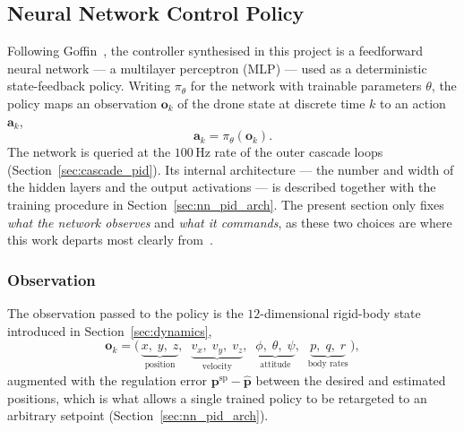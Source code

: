 \documentclass[11pt,a4paper]{article}
\theoremstyle{remark}
\numberwithin{equation}{section}
\begin{document}
\subsection{Neural Network Control Policy}\label{sec:nn_policy}

Following Goffin~\cite{goffin2026}, the controller synthesised in this project is a
feedforward neural network --- a multilayer perceptron (MLP) --- used as a deterministic
state-feedback policy. Writing $\pi_\theta$ for the network with trainable parameters
$\theta$, the policy maps an observation $\mathbf{o}_k$ of the drone state at discrete
time $k$ to an action $\mathbf{a}_k$,
\begin{equation}
\mathbf{a}_k = \pi_\theta(\mathbf{o}_k).
\label{eq:policy}
\end{equation}
The network is queried at the $100\,\mathrm{Hz}$ rate of the outer cascade loops
(Section~\ref{sec:cascade_pid}). Its internal architecture --- the number and width of
the hidden layers and the output activations --- is described together with the training
procedure in Section~\ref{sec:nn_pid_arch}. The present section only fixes \emph{what the
network observes} and \emph{what it commands}, as these two choices are where this work
departs most clearly from~\cite{goffin2026}.

\subsubsection*{Observation}

The observation passed to the policy is the $12$-dimensional rigid-body state introduced
in Section~\ref{sec:dynamics},
\begin{equation}
\mathbf{o}_k = \big(\,
\underbrace{x,\;y,\;z}_{\text{position}},\;\;
\underbrace{v_x,\;v_y,\;v_z}_{\text{velocity}},\;\;
\underbrace{\phi,\;\theta,\;\psi}_{\text{attitude}},\;\;
\underbrace{p,\;q,\;r}_{\text{body rates}}
\,\big),
\label{eq:observation}
\end{equation}
augmented with the regulation error $\mathbf{p}^{\mathrm{sp}} - \hat{\mathbf{p}}$ between
the desired and estimated positions, which is what allows a single trained policy to be
retargeted to an arbitrary setpoint (Section~\ref{sec:nn_pid_arch}).
\end{document}
